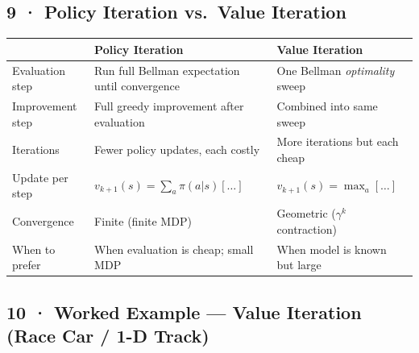 \documentclass[11pt,a4paper]{article}
\begin{document}
\subsection*{9 · Policy Iteration vs.\ Value Iteration}

\begin{center}
\begin{tabular}{p{4cm}p{5.5cm}p{5.5cm}}
\toprule
& \textbf{Policy Iteration} & \textbf{Value Iteration} \\
\midrule
Evaluation step & Run full Bellman expectation until convergence & One Bellman \emph{optimality} sweep \\
Improvement step & Full greedy improvement after evaluation & Combined into same sweep \\
Iterations & Fewer policy updates, each costly & More iterations but each cheap \\
Update per step & $v_{k+1}(s) = \sum_a \pi(a|s)[\ldots]$ & $v_{k+1}(s) = \max_a [\ldots]$ \\
Convergence & Finite (finite MDP) & Geometric ($\gamma^k$ contraction) \\
When to prefer & When evaluation is cheap; small MDP & When model is known but large \\
\bottomrule
\end{tabular}
\end{center}

\subsection*{10 · Worked Example — Value Iteration (Race Car / 1-D Track)}
\end{document}
